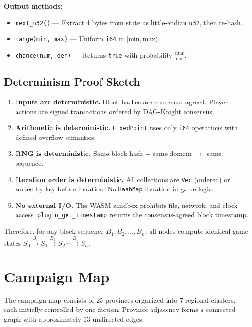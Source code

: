 \documentclass[a4paper, 11pt]{article}
\newcommand{\fp}{\texttt{FixedPoint}}
\begin{document}
\textbf{Output methods:}

\begin{itemize}
  \item \texttt{next\_u32()} --- Extract 4 bytes from state as little-endian \texttt{u32}, then re-hash.
  \item \texttt{range(min, max)} --- Uniform \texttt{i64} in $[\text{min}, \text{max})$.
  \item \texttt{chance(num, den)} --- Returns \texttt{true} with probability $\frac{\text{num}}{\text{den}}$.
\end{itemize}

\subsection{Determinism Proof Sketch}

\begin{enumerate}
  \item \textbf{Inputs are deterministic.} Block hashes are consensus-agreed.
    Player actions are signed transactions ordered by DAG-Knight consensus.
  \item \textbf{Arithmetic is deterministic.} \fp{} uses only \texttt{i64}
    operations with defined overflow semantics.
  \item \textbf{RNG is deterministic.} Same block hash + same domain
    $\Rightarrow$ same sequence.
  \item \textbf{Iteration order is deterministic.} All collections are
    \texttt{Vec} (ordered) or sorted by key before iteration. No
    \texttt{HashMap} iteration in game logic.
  \item \textbf{No external I/O.} The WASM sandbox prohibits file, network,
    and clock access. \texttt{plugin\_get\_timestamp} returns the
    consensus-agreed block timestamp.
\end{enumerate}

Therefore, for any block sequence $B_1, B_2, \ldots, B_n$, all nodes compute
identical game states $S_0 \xrightarrow{B_1} S_1 \xrightarrow{B_2} S_2
\cdots \xrightarrow{B_n} S_n$.


\section{Campaign Map}
\label{sec:map}

The campaign map consists of 25 provinces organized into 7 regional clusters,
each initially controlled by one faction. Province adjacency forms a connected
graph with approximately 63 undirected edges.
\end{document}
